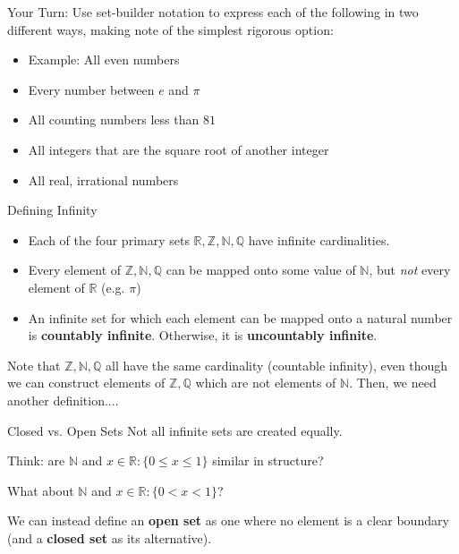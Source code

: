\documentclass[10pt]{beamer}
\begin{document}
\begin{frame}{Your Turn:}
    Use set-builder notation to express each of the following in two different ways, making note of the simplest rigorous option:

    \begin{itemize}
        \item Example: All even numbers \\
        \pause
        \item Every number between $e$ and $\pi$
        \item All counting numbers less than $81$
        \item All integers that are the square root of another integer
        \item All real, irrational numbers
    \end{itemize}
\end{frame}



\begin{frame}{Defining Infinity}
    \begin{itemize}
        \item Each of the four primary sets $\mathbb{R,Z,N,Q}$ have infinite cardinalities.
        \item Every element of $\mathbb{Z,N,Q}$ can be mapped onto some value of $\mathbb{N}$, but \textit{not} every element of $\mathbb{R}$ (e.g. $\pi$)
        \item An infinite set for which each element can be mapped onto a natural number is \textbf{countably infinite}. Otherwise, it is \textbf{uncountably infinite}. 
    \end{itemize}
Note that  $\mathbb{Z,N,Q}$ all have the same cardinality (countable infinity), even though we can construct elements of $\mathbb{Z,Q}$ which are not elements of $\mathbb{N}$. Then, we need another definition....
\end{frame}



\begin{frame}{Closed vs. Open Sets}
    Not all infinite sets are created equally.

    Think: are $\mathbb{N}$ and $x \in \mathbb{R}: \{0 \leq x \leq 1\}$ similar in structure? 
    
    \pause
    
    What about $\mathbb{N}$ and $x \in \mathbb{R}: \{ 0 < x < 1\}$?

    \pause

    We can instead define an \textbf{open set} as one where no element is a clear boundary (and a \textbf{closed set} as its alternative).
\end{frame}
\end{document}
